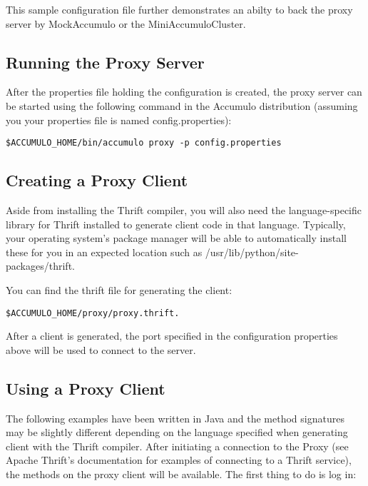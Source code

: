 This sample configuration file further demonstrates an abilty to back the proxy server
by MockAccumulo or the MiniAccumuloCluster.

\subsection{Running the Proxy Server}

After the properties file holding the configuration is created, the proxy server
can be started using the following command in the Accumulo distribution (assuming
you your properties file is named config.properties):

\small
\begin{verbatim}
$ACCUMULO_HOME/bin/accumulo proxy -p config.properties
\end{verbatim}
\normalsize

\subsection{Creating a Proxy Client}

Aside from installing the Thrift compiler, you will also need the language-specific library
for Thrift installed to generate client code in that language. Typically, your operating
system's package manager will be able to automatically install these for you in an expected
location such as /usr/lib/python/site-packages/thrift.

You can find the thrift file for generating the client:

\small
\begin{verbatim}
$ACCUMULO_HOME/proxy/proxy.thrift.
\end{verbatim}
\normalsize

After a client is generated, the port specified in the configuration properties above will be
used to connect to the server.

\subsection{Using a Proxy Client}

The following examples have been written in Java and the method signatures may be
slightly different depending on the language specified when generating client with
the Thrift compiler. After initiating a connection to the Proxy (see Apache Thrift's
documentation for examples of connecting to a Thrift service), the methods on the
proxy client will be available. The first thing to do is log in:

